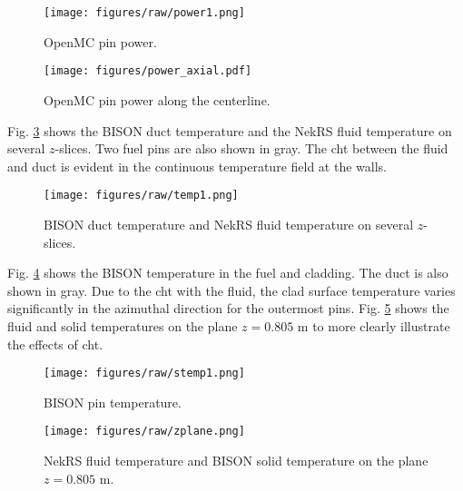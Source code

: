\documentclass[3p,,preprint,11pt]{elsarticle}
\begin{document}
\begin{figure}[!htb]                                                                                                  
\centering
\texttt{[image: figures/raw/power1.png]}
\caption{OpenMC pin power.}
\label{fig:power}
\end{figure}

\begin{figure}[!htb]                                                                                                  
\centering
\texttt{[image: figures/power\_axial.pdf]}
\caption{OpenMC pin power along the centerline.}
\label{fig:power_axial}
\end{figure}

Fig. \ref{fig:temperature} shows the BISON duct temperature and the NekRS fluid temperature on several $z$-slices. Two fuel pins are also shown in gray. The \gls{cht} between the fluid and duct is evident in the continuous temperature field at the walls. 

\begin{figure}[!htb]                                                                                                  
\centering
\texttt{[image: figures/raw/temp1.png]}
\caption{BISON duct temperature and NekRS fluid temperature on several $z$-slices.}
\label{fig:temperature}
\end{figure}

Fig. \ref{fig:solid_temperature} shows the BISON temperature in the fuel and cladding. The duct is also shown in gray. Due to the \gls{cht} with the fluid, the clad surface temperature varies significantly in the azimuthal direction for the outermost pins.  Fig. \ref{fig:zplane} shows the fluid and solid temperatures on the plane $z=0.805$ \si{\meter} to more clearly illustrate the effects of \gls{cht}. 

\begin{figure}[!htb]                                                                                                  
\centering
\texttt{[image: figures/raw/stemp1.png]}
\caption{BISON pin temperature.}
\label{fig:solid_temperature}
\end{figure}

\begin{figure}[!htb]                                                                                                  
\centering
\texttt{[image: figures/raw/zplane.png]}
\caption{NekRS fluid temperature and BISON solid temperature on the plane $z=0.805$ \si{\meter}.}
\label{fig:zplane}
\end{figure}
\end{document}
